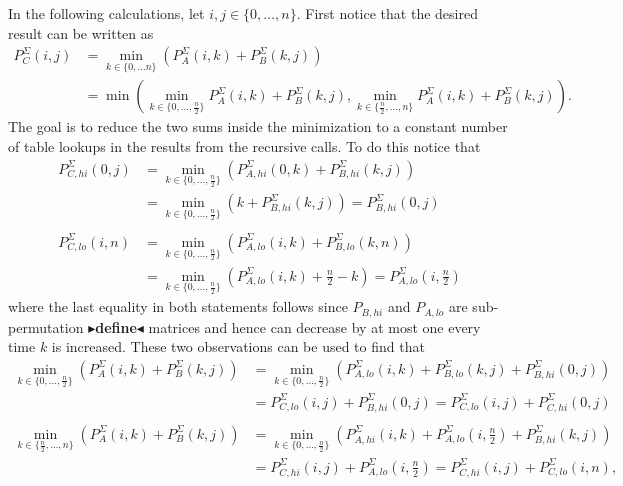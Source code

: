 \documentclass[twoside,11pt,openright]{report}
\newcommand{\todo}[1]{{\color[rgb]{.5,0,0}\textbf{$\blacktriangleright$#1$\blacktriangleleft$}}}
\begin{document}
In the following calculations, let $i, j \in \{0, \dots, n\}$. First notice that the desired result can be written as
\begin{align*}
  P_C^{\Sigma}(i, j) &= \min_{k \in \{0, \dots n\}} \left( P_A^{\Sigma}(i, k) + P_B^{\Sigma}(k, j) \right) \\
    &= \min\left( \min_{k \in \{0, \dots, \frac{n}{2}\}} {P_A^{\Sigma}(i, k) + P_B^{\Sigma}(k, j)}, \min_{k \in \{\frac{n}{2}, \dots, n\}} {P_A^{\Sigma}(i, k) + P_B^{\Sigma}(k, j)} \right).
\end{align*}
The goal is to reduce the two sums inside the minimization to a constant number of table lookups in the results from the recursive calls. To do this notice that
\begin{align*}
  P_{C,hi}^{\Sigma}(0, j) &= \min_{k \in \{0, \dots, \frac{n}{2}\}} \left( P_{A,hi}^{\Sigma}(0, k) + P_{B,hi}^{\Sigma}(k, j) \right) \\
    &= \min_{k \in \{0, \dots, \frac{n}{2}\}} \left( k + P_{B,hi}^{\Sigma}(k, j) \right) = P_{B,hi}^{\Sigma}(0, j)
  \\ \\
  P_{C,lo}^{\Sigma}(i, n) &= \min_{k \in \{0, \dots, \frac{n}{2}\}} \left( P_{A,lo}^{\Sigma}(i, k) + P_{B,lo}^{\Sigma}(k, n) \right) \\
    &= \min_{k \in \{0, \dots, \frac{n}{2}\}} \left( P_{A,lo}^{\Sigma}(i, k) + \frac{n}{2} - k \right)
    = P_{A,lo}^{\Sigma}(i, \frac{n}{2})
\end{align*}
where the last equality in both statements follows since $P_{B,hi}$ and $P_{A,lo}$ are sub-permutation \todo{define} matrices and hence can decrease by at most one every time $k$ is increased. These two observations can be used to find that
\begin{align*}
  \min_{k \in \{0, \dots, \frac{n}{2}\}} \left( P_A^{\Sigma}(i, k) + P_B^{\Sigma}(k, j) \right)
    &= \min_{k \in \{0, \dots, \frac{n}{2}\}} \left( P_{A,lo}^{\Sigma}(i, k) + P_{B,lo}^{\Sigma}(k, j) + P_{B,hi}^{\Sigma}(0, j) \right) \\
    &= P_{C,lo}^{\Sigma}(i, j) + P_{B,hi}^{\Sigma}(0, j)
    = P_{C,lo}^{\Sigma}(i, j) + P_{C,hi}^{\Sigma}(0, j)
  \\ \\
  \min_{k \in \{\frac{n}{2}, \dots, n\}} \left( P_A^{\Sigma}(i, k) + P_B^{\Sigma}(k, j) \right)
    &= \min_{k \in \{0, \dots, \frac{n}{2}\}} \left( P_{A,hi}^{\Sigma}(i, k) + P_{A,lo}^{\Sigma}(i, \frac{n}{2}) + P_{B,hi}^{\Sigma}(k, j) \right) \\
    &= P_{C,hi}^{\Sigma}(i, j) + P_{A,lo}^{\Sigma}(i, \frac{n}{2})
    = P_{C,hi}^{\Sigma}(i, j) + P_{C,lo}^{\Sigma}(i, n),
\end{align*}
\end{document}
